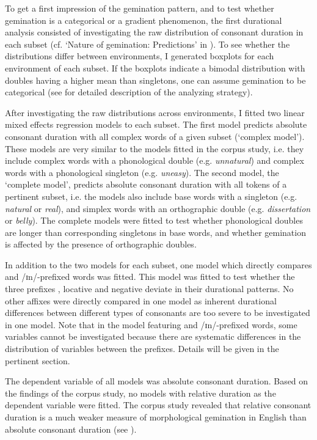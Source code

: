 To get a first impression of the gemination pattern, and to test whether gemination is a categorical or a gradient phenomenon, the first durational analysis consisted of investigating the raw distribution of consonant duration in each subset (cf. `Nature of gemination: Predictions' in ). To see whether the distributions differ between environments, I generated boxplots for each environment of each subset. 
If the boxplots indicate a bimodal distribution with doubles having a higher mean than singletons, one can assume gemination to be categorical (see  for detailed description of the analyzing strategy). 

After investigating the raw distributions across environments, I fitted two linear mixed effects regression models to each subset. 
The first model predicts absolute consonant duration with all complex words of a given subset (`complex model'). These models are very similar to the models fitted in the corpus study, i.e. they include complex words with a phonological double (e.g. \textit{unnatural}) and complex words with a phonological singleton (e.g. \textit{uneasy}). 
The second model, the `complete model', predicts absolute consonant duration with all tokens of a pertinent subset, i.e. the models also include base words with a singleton (e.g. \textit{natural} or \textit{real}), and simplex words with an orthographic double (e.g. \textit{dissertation} or \textit{belly}). The complete models were fitted to test whether phonological doubles are longer than corresponding singletons in base words, and whether gemination is affected by the presence of orthographic doubles. 

In addition to the two models for each subset, one model which directly compares  and /ɪn/-prefixed words was fitted. This model was fitted to test whether the three prefixes , locative  and negative  deviate in their durational patterns. No other affixes were directly compared in one model as inherent durational differences between different types of consonants are too severe to be investigated in one model. Note that in the model featuring  and /ɪn/-prefixed words, some variables cannot be investigated because there are systematic differences in the distribution of variables between the prefixes. Details will be given in the pertinent section.


The dependent variable of all models was absolute consonant duration. Based on the findings of the corpus study, no models with relative duration as the dependent variable were fitted.  The corpus study revealed that relative consonant duration is a much weaker measure of morphological gemination in English than absolute consonant duration (see ).

